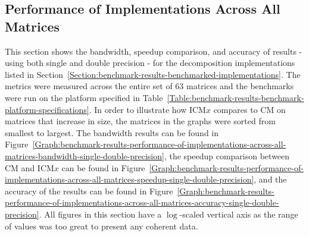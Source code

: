 \subsection{Performance of Implementations Across All Matrices \TO}\label{Subsection:benchmark-results-performance-of-implementations-across-all-matrices}
This section shows the bandwidth, speedup comparison, and accuracy of results - using both single and double precision - for the decomposition implementations listed in Section~\ref{Section:benchmark-results-benchmarked-implementations}. The metrics were measured across the entire set of 63 matrices and the benchmarks were run on the platform specified in Table~\ref{Table:benchmark-results-benchmark-platform-specifications}. In order to illustrate how ICM$ x $ compares to CM on matrices that increase in size, the matrices in the graphs were sorted from smallest to largest. The bandwidth results can be found in Figure~\ref{Graph:benchmark-results-performance-of-implementations-across-all-matrices-bandwidth-single-double-precision}, the speedup comparison between CM and ICM$ x $ can be found in Figure~\ref{Graph:benchmark-results-performance-of-implementations-across-all-matrices-speedup-single-double-precision}, and the accuracy of the results can be found in Figure~\ref{Graph:benchmark-results-performance-of-implementations-across-all-matrices-accuracy-single-double-precision}. All figures in this section have a $ \log $-scaled vertical axis as the range of values was too great to present any coherent data.

